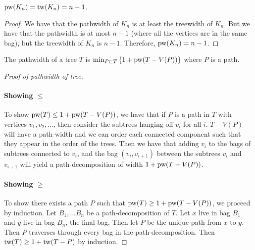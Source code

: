 \begin{example}
	$\text{pw}(K_n) = \text{tw}(K_n) = n - 1$. 
\end{example}
\begin{proof}
	We have that the pathwidth of $K_n$ is at least the treewidth of $K_n$. But we have that the pathwidth is at most $n- 1$ (where all the vertices are in the same bag), but the treewidth of $K_n$ is $n - 1$. Therefore, $\text{pw}(K_n) = n - 1$. 
\end{proof}

\begin{theorem}
	The pathwidth of a tree $T$ is $\min_{P \subset T} \left\lbrace 1 + \text{pw}(T - V(P))\right\rbrace $ where $P$ is a path.
\end{theorem}

\begin{proof}[Proof of pathwidth of tree]
	\item
	\paragraph{Showing $\leq$}
	To show $\text{pw}(T) \leq 1 + \text{pw}(T - V(P))$, we have that if $P$ is a path in $T$ with vertices $v_1, v_2, ...$, then consider the subtrees hanging off $v_i$ for all $i$. $T - V(P)$ will have a path-width and we can order each connected component such that they appear in the order of the trees. Then we have that adding $v_i$ to the bags of subtrees connected to $v_i$, and the bag $(v_i, v_{i+1})$ between the subtrees $v_i$ and $v_{i + 1}$ will yield a path-decomposition of width $1 + \text{pw}(T - V(P))$. 
	\item
	\paragraph{Showing $\geq$}
	To show there exists a path $P$ such that $\text{pw}(T) \geq 1 + \text{pw}(T - V(P))$, we proceed by induction. Let $B_1, ... B_n$ be a path-decomposition of $T$. Let $x$ live in bag $B_1$ and $y$ live in bag $B_n$, the final bag. Then let $P$ be the unique path from $x$ to $y$. Then $P$ traverses through every bag in the path-decomposition. Then $\text{tw}(T) \geq 1 + \text{tw}(T - P)$ by induction. 
\end{proof}